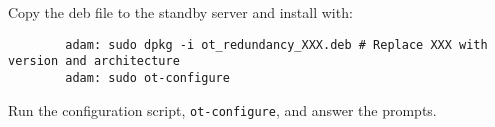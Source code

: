 \documentclass[a4paper]{article}
\begin{document}
	Copy the deb file to the standby server and install with:
	\begin{verbatim}
		adam: sudo dpkg -i ot_redundancy_XXX.deb # Replace XXX with version and architecture
		adam: sudo ot-configure
	\end{verbatim}
	Run the configuration script, \texttt{ot-configure}, and answer the prompts.
	








\end{document}
